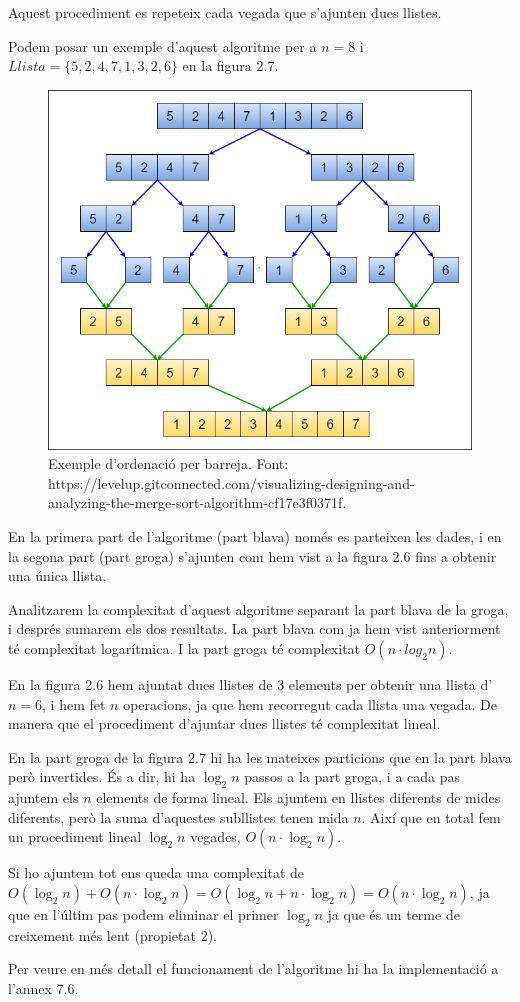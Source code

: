 Aquest procediment es repeteix cada vegada que s'ajunten dues llistes.

Podem posar un exemple d'aquest algoritme per a $n = 8$ i $Llista = \lbrace5, 2, 4, 7, 1, 3, 2, 6\rbrace$ en la figura 2.7.
\begin{figure}[H]
    \centering
    \includegraphics[width=.55\textwidth]{capitols/figures/merge5.png}
    \vspace{10pt}
    \caption[Exemple d'ordenació per barreja.]{Exemple d'ordenació per barreja. Font: https://levelup.gitconnected.com/visualizing-designing-and-analyzing-the-merge-sort-algorithm-cf17e3f0371f.}
    \label{fig:my_label}
\end{figure}

\vspace{-18pt}
En la primera part de l'algoritme (part blava) només es parteixen les dades, i en la segona part (part groga) s'ajunten com hem vist a la figura 2.6 fins a obtenir una única llista.

Analitzarem la complexitat d'aquest algoritme separant la part blava de la groga, i després sumarem els dos resultats. La part blava com ja hem vist anteriorment té complexitat logarítmica. I la part groga té complexitat $O(n \cdot log_2{n})$.

En la figura 2.6 hem ajuntat dues llistes de 3 elements per obtenir una llista d'$n = 6$, i hem fet $n$ operacions, ja que hem recorregut cada llista una vegada. De manera que el procediment d'ajuntar dues llistes té complexitat lineal.

En la part groga de la figura 2.7 hi ha les mateixes particions que en la part blava però invertides. És a dir, hi ha $\log_2{n}$ passos a la part groga, i a cada pas ajuntem els $n$ elements de forma lineal. Els ajuntem en llistes diferents de mides diferents, però la suma d'aquestes subllistes tenen mida $n$. Així que en total fem un procediment lineal $\log_2{n}$ vegades, $O(n \cdot \log_2{n})$.

Si ho ajuntem tot ens queda una complexitat de $O(\log_2{n}) + O(n \cdot \log_2{n} ) = O(\log_2{n} + n \cdot \log_2{n}) = O(n \cdot \log_2{n})$, ja que en l'últim pas podem eliminar el primer $\log_2{n}$ ja que és un terme de creixement més lent (propietat 2).

Per veure en més detall el funcionament de l'algoritme hi ha la implementació a l'annex 7.6.
